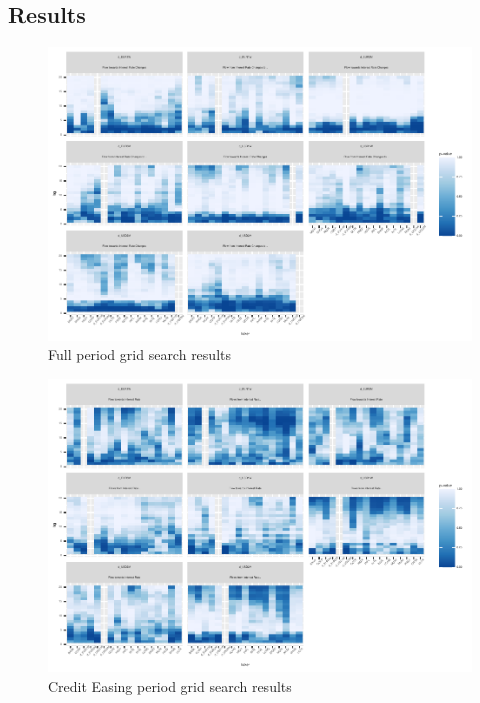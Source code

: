 \documentclass[
]{article}
\begin{document}
\hypertarget{results-1}{%
\subsection{Results}\label{results-1}}

\begin{figure}
\centering
\includegraphics{working_paper_files/figure-latex/full-1.pdf}
\caption{Full period grid search results}
\end{figure}

\begin{figure}
\centering
\includegraphics{working_paper_files/figure-latex/CE-1.pdf}
\caption{Credit Easing period grid search results}
\end{figure}
\end{document}
